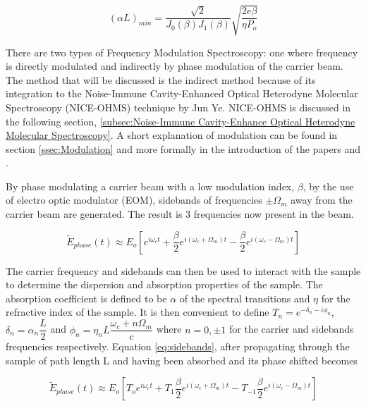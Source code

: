 \documentclass[11pt,a4paper]{book}
\begin{document}
			\begin{equation}
			\label{eq:FMSlimit}
			(\alpha L)_{min}=\dfrac{\sqrt{2}}{J_0(\beta)J_1(\beta)}\sqrt{\dfrac{2e\beta}{\eta P_o}}
			\end{equation}
			
			There are two types of Frequency Modulation Spectroscopy: one where frequency is directly modulated and indirectly by phase modulation of the carrier beam. The method that will be discussed is the indirect method because of its integration to the Noise-Immune Cavity-Enhanced Optical Heterodyne Molecular Spectroscopy (NICE-OHMS) technique by Jun Ye. NICE-OHMS is discussed in the following section, \autoref{subsec:Noise-Immune Cavity-Enhance Optical Heterodyne Molecular Spectroscopy}.  A short explanation of modulation can be found in section \autoref{ssec:Modulation} and more formally in the introduction of the papers \cite{PDH Intro} and \cite{FMspec}.
			
			By phase modulating a carrier beam with a low modulation index, $\beta$, by the use of electro optic modulator (EOM), sidebands of frequencies $\pm \Omega_m $ away from the carrier beam are generated. The result is 3 frequencies now present in the beam.
			
			\begin{equation}
			\label{eq:sidebands}
			\tilde{E}_{phase}(t)\approx E_o [e^{i\omega_c t}   +   \dfrac{\beta}{2} e^{i(\omega_c +\Omega_m)t}  -  \dfrac{\beta}{2} e^{i(\omega_c -\Omega_m)t}]
			\end{equation}	
			
			The carrier frequency and sidebands can then be used to interact with the sample to determine the dispersion and absorption properties of the sample. The absorption coefficient is defined to be $\alpha$ of the spectral transitions and $\eta$ for the refractive index of the sample. It is then convenient to define $T_n=e^{-\delta_n -i \phi_n}$, $\delta_n=\alpha_n \dfrac{L}{2}$ and $\phi_n=\eta_n L\dfrac{\omega_c + n\Omega_m}{c}$ where $n=0,\pm1$ for the carrier and sidebands frequencies respectively. Equation \autoref{eq:sidebands}, after propagating through the sample of path length L and having been absorbed and its phase shifted becomes
			
			\begin{equation}
			\tilde{E}_{phase}(t)\approx E_o [T_o e^{i\omega_c t}   +   T_1 \dfrac{\beta}{2} e^{i(\omega_c +\Omega_m)t}  -  T_{-1} \dfrac{\beta}{2} e^{i(\omega_c -\Omega_m)t}]
			\end{equation}
			
\end{document}
